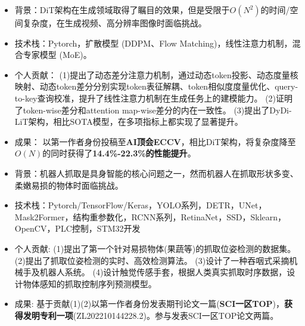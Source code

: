 \documentclass{resume}
\begin{document}
\begin{itemize}[parsep=\itemparsep]
  \item 背景：DiT架构在生成领域取得了瞩目的效果，但是受限于$O(N^2)$的时间/空间复杂度，在生成视频、高分辨率图像时面临挑战。
  \item 技术栈：Pytorch，扩散模型 (DDPM、Flow Matching)，线性注意力机制，混合专家模型 (MoE)。
  \item 个人贡献：
  (1)提出了动态差分注意力机制，通过动态token投影、动态度量核映射、动态token差分分别实现token表征解耦、token相似度度量优化、query-to-key查询校准，提升了线性注意力机制在生成任务上的建模能力。
  (2)证明了token-wise差分和attention map-wise差分的内在一致性。
  (3)提出了DyDi-LiT架构，相比SOTA模型，在多项指标上都实现了显著提升。
  \item 成果：
  以第一作者身份投稿至\textbf{AI顶会ECCV}，相比DiT架构，将复杂度降至$O(N)$的同时获得了\textbf{14.4\%-22.3\%的性能提升}。
\end{itemize}


\begin{itemize}[parsep=\itemparsep]
  \item	背景：机器人抓取是具身智能的核心问题之一，然而机器人在抓取形状多变、柔嫩易损的物体时面临挑战。
  \item 技术栈：Pytorch/TensorFlow/Keras，YOLO系列，DETR，UNet，Mask2Former，结构重参数化，RCNN系列，RetinaNet，SSD，Sklearn，OpenCV，PLC控制，STM32开发
  \item 个人贡献:
  (1)提出了第一个针对易损物体(果蔬等)的抓取位姿检测的数据集。
  (2)提出了抓取位姿检测的实时、高效检测算法。
  (3)设计了一种吞咽式采摘机械手及机器人系统。
  (4)设计触觉传感手套，根据人类真实抓取时序数据，设计物体感知的抓取控制序列预测模型。
  \item 成果:
  基于贡献(1)(2)以第一作者身份发表期刊论文一篇(\textbf{SCI一区TOP})，\textbf{获得发明专利一项}(ZL202210144228.2)。参与发表SCI一区TOP论文两篇。
\end{itemize}


\end{document}
